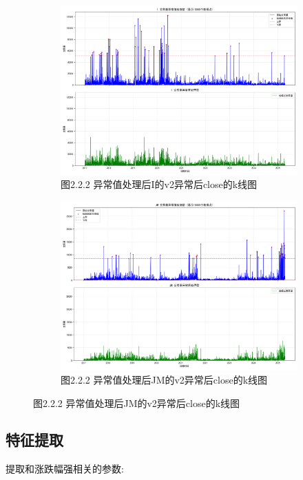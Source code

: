 \documentclass[a4paper,12pt]{ctexart}
\begin{document}
\begin{enumerate}
\begin{figure}[H]
\begin{subfigure}[t]{0.4\textwidth}
    \includegraphics[width=\textwidth]{./v2/v3/I.png}
    \caption*{图2.2.2 异常值处理后I的v2异常后close的k线图}
  \end{subfigure}
  \hfill
  \begin{subfigure}[t]{0.4\textwidth}
    \includegraphics[width=\textwidth]{./v2/v3/JM.png}
    \caption*{图2.2.2 异常值处理后JM的v2异常后close的k线图}
  \end{subfigure}
\end{figure}
\end{enumerate}
\newpage
\subsection{特征提取}
提取和涨跌幅强相关的参数:
\end{document}

